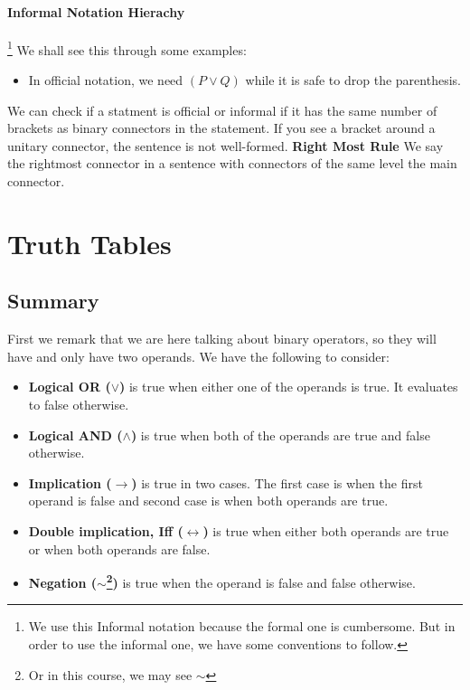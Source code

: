 \documentclass[10pt]{article}
\renewcommand{\iff}{\leftrightarrow}
\renewcommand{\implies}{\rightarrow}
\renewcommand{\neg}{\sim}
\begin{document}
\paragraph{Informal Notation Hierachy}\footnote{We use this Informal notation because the formal one is cumbersome. But in order to use the informal one, we have some conventions to follow.} 
We shall see this through some examples:
\begin{itemize}
    \item In official notation, we need $(P\vee Q)$ while it is safe to drop the parenthesis.
\end{itemize}
We can check if a statment is official or informal if it has the same number of brackets as binary connectors in the statement. If you see a bracket around a unitary connector, the sentence is not well-formed.
\textbf{Right Most Rule} We say the rightmost connector in a sentence with connectors of the same level the main connector.



\section{Truth Tables}
\subsection{Summary} First we remark that we are here talking about binary operators, 
so they will have and only have two operands. We have the following to consider:
\begin{itemize}
    \item \textbf{Logical OR ($\vee$)} is true when either one of the operands is true. 
        It evaluates to false otherwise.
    \item \textbf{Logical AND ($\land$)} is true when both of the operands are true and false otherwise.
    \item \textbf{Implication ($\implies$)} is true in two cases. The first case is when the
        first operand is false and second case is when both operands are true.
    \item \textbf{Double implication, Iff ($\iff$)} is true when either both operands are true 
        or when both operands are false.
    \item \textbf{Negation ($\neg$\footnote{Or in this course, we may see $\sim$})} is true when the operand
        is false and false otherwise.
\end{itemize}
\end{document}
